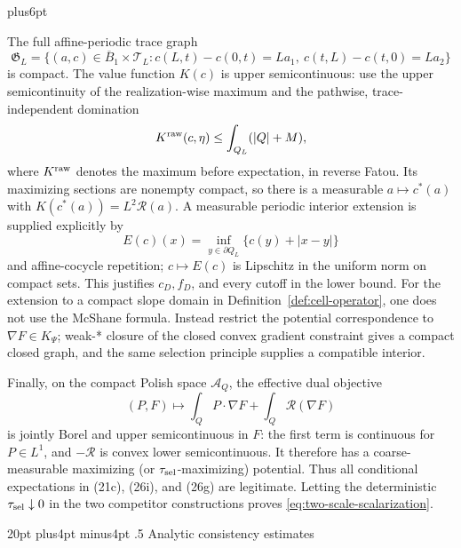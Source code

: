 \documentclass[11pt,reqno]{amsart}
\makeatletter
\def\section{\@startsection{section}{1}{0pt}%
  {20pt plus4pt minus4pt}
  {.5\linespacing}
  {\normalfont\bfseries}}
\theoremstyle{plain}
\theoremstyle{definition}
\theoremstyle{remark}
\renewenvironment{proof}[1][\proofname]{%
  \par
  \pushQED{\qed}%
  \normalfont
  \topsep6pt plus6pt\relax
  \trivlist
  \item[\hskip\labelsep\slshape #1\@addpunct{.}]%
  \ignorespaces
}{%
  \popQED
  \endtrivlist
  \@endpefalse
}
\DeclareRobustCommand{\qed}{%
  \leavevmode\unskip\penalty9999\hbox{}\nobreak
  \ifmmode
    \makebox[0pt][l]{\qquad\hbox{\qedsymbol}}%
  \else
    \qquad\hbox{\qedsymbol}%
  \fi
}
\renewcommand{\qedsymbol}{\rule[.47pt]{4pt}{6pt}}
\numberwithin{equation}{section}
\newcommand{\1}{\mathbf 1}
\makeatother
\begin{document}
\begin{proof}
The full affine-periodic trace graph
\begin{equation}
\mathfrak G_ L=\{(a,c)\in\overline B_ 1\times\mathcal T_ L:
c(L,t)-c(0,t)=La_ 1,\ c(t,L)-c(t,0)=La_ 2\}
\tag{26r}
\end{equation}
is compact.  The value function $K(c)$ is upper semicontinuous: use the
upper semicontinuity of the realization-wise maximum and the pathwise,
trace-independent domination
\begin{equation*}
K^{\rm raw}(c,\eta)\leq\int_ {Q_ L}(|Q|+M),
\end{equation*}
where
$K^{\rm raw}$ denotes the maximum before expectation, in reverse
Fatou.  Its maximizing sections are
nonempty compact, so there is a measurable
$a\mapsto c^*(a)$ with $K(c^*(a))=L^2\mathcal R(a)$.  A measurable periodic
interior extension is supplied explicitly by
\begin{equation*}
E(c)(x)=\inf_ {y\in\partial Q_ L}\{c(y)+|x-y|\}
\end{equation*}
and affine-cocycle repetition; $c\mapsto E(c)$ is Lipschitz in the
uniform norm on compact sets.  This justifies $c_ D,f_ D$, and every
cutoff in the lower bound.  For the extension to a compact slope domain
in Definition~\ref{def:cell-operator}, one does not use the McShane formula.
Instead restrict
the potential correspondence to $\nabla F\in K_ \Psi$; weak-* closure
of the closed convex gradient constraint gives a compact closed graph,
and the same selection principle supplies a compatible interior.

Finally, on the compact Polish space $\mathscr A_ Q$, the effective
dual objective
\begin{equation}
(P,F)\longmapsto\int_ QP\cdot\nabla F+\int_ Q\mathcal R(\nabla F)
\tag{26s}
\end{equation}
is jointly Borel and upper semicontinuous in $F$: the first term is
continuous for $P\in L^1$, and $-\mathcal R$ is convex lower
semicontinuous.  It therefore has a coarse-measurable maximizing (or
$\tau_{\rm sel}$-maximizing) potential.  Thus all conditional expectations in
(21c), (26i), and (26g) are legitimate.  Letting the deterministic
$\tau_{\rm sel}\downarrow0$ in the two
competitor constructions proves \eqref{eq:two-scale-scalarization}.

\end{proof}

\section{Analytic consistency estimates}\label{sec:consistency}
\end{document}
